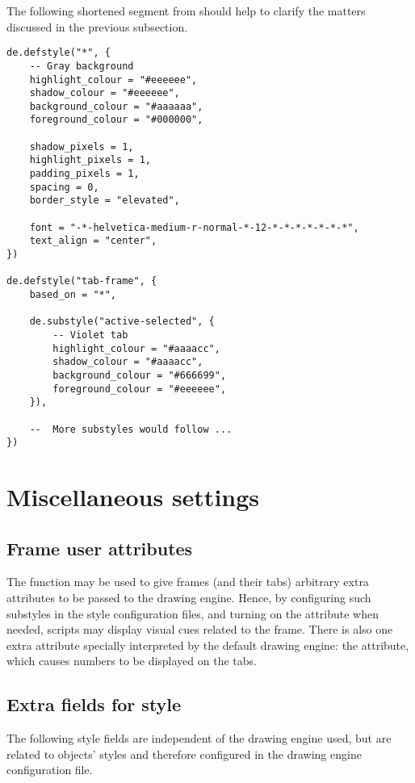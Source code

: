 The following shortened segment from 
should help to clarify the matters discussed in the previous
subsection.

\begin{verbatim}
de.defstyle("*", {
    -- Gray background
    highlight_colour = "#eeeeee",
    shadow_colour = "#eeeeee",
    background_colour = "#aaaaaa",
    foreground_colour = "#000000",
    
    shadow_pixels = 1,
    highlight_pixels = 1,
    padding_pixels = 1,
    spacing = 0,
    border_style = "elevated",
    
    font = "-*-helvetica-medium-r-normal-*-12-*-*-*-*-*-*-*",
    text_align = "center",
})

de.defstyle("tab-frame", {
    based_on = "*",
    
    de.substyle("active-selected", {
        -- Violet tab
        highlight_colour = "#aaaacc",
        shadow_colour = "#aaaacc",
        background_colour = "#666699",
        foreground_colour = "#eeeeee",
    }),

    --  More substyles would follow ...
})
\end{verbatim}


\section{Miscellaneous settings}
\label{sec:grmisc}


\subsection{Frame user attributes}

The function  may be used to give frames
(and their tabs) arbitrary extra attributes to be passed to the
drawing engine. Hence, by configuring such substyles in the style
configuration files, and turning on the attribute when needed, 
scripts may display visual cues related to the frame. There is
also one extra attribute specially interpreted by the default
drawing engine: the  attribute, which causes 
numbers to be displayed on the tabs.


\subsection{Extra fields for style }

The following style fields are independent of the drawing engine used,
but are related to objects' styles and therefore configured in the drawing
engine configuration file.

